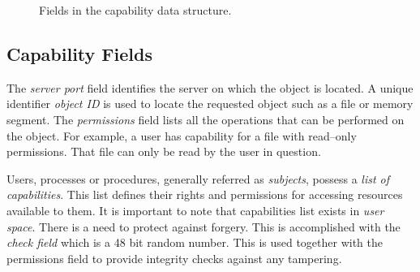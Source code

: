 \documentclass[11pt,a4paper]{article}
\begin{document}
\begin{figure}[here]
\centering
{}
\caption{Fields in the capability data structure.}
\label{capability-DS}
\end{figure}

\subsection{Capability Fields}

The \emph{server port} field identifies the server on which the object is located. A unique identifier \emph{object ID} is used to locate the requested object such as a file or memory segment. The \emph{permissions} field lists all the operations that can be performed on the object. For example, a user has capability for a file with read--only permissions. That file can only be read by the user in question.

Users, processes or procedures, generally referred as \emph{subjects}, possess a \emph{list of capabilities}. This list defines their rights and permissions for accessing resources available to them. It is important to note that capabilities list exists in \emph{user space}. There is a need to protect against forgery. This is accomplished with the \emph{check field} which is a 48 bit random number. This is used together with the permissions field to provide integrity checks against any tampering.
\end{document}

